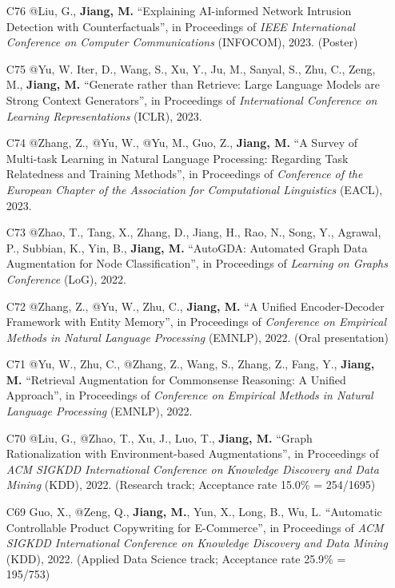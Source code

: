 \documentclass[10pt]{article}
\newenvironment{myindentpar}[1]%
{\begin{list}{}%
         {\setlength{\leftmargin}{#1}}%
         \item[]%
}
{\end{list}}
\newcounter{list}
\begin{document}
\begin{myindentpar}{0.00cm}
\begin{enumerate}[leftmargin=.5cm]
\item[C76] @Liu, G., \textbf{Jiang, M.} ``Explaining AI-informed Network Intrusion Detection with Counterfactuals'', in Proceedings of \textit{IEEE International Conference on Computer Communications} (INFOCOM), 2023. (Poster)
		
\item[C75] @Yu, W. Iter, D., Wang, S., Xu, Y., Ju, M., Sanyal, S., Zhu, C., Zeng, M., \textbf{Jiang, M.} ``Generate rather than Retrieve: Large Language Models are Strong Context Generators'', in Proceedings of \textit{International Conference on Learning Representations} (ICLR), 2023.

\item[C74] @Zhang, Z., @Yu, W., @Yu, M., Guo, Z., \textbf{Jiang, M.} ``A Survey of Multi-task Learning in Natural Language Processing: Regarding Task Relatedness and Training Methods'', in Proceedings of \textit{Conference of the European Chapter of the Association for Computational Linguistics} (EACL), 2023.

\item[C73] @Zhao, T., Tang, X., Zhang, D., Jiang, H., Rao, N., Song, Y., Agrawal, P., Subbian, K., Yin, B., \textbf{Jiang, M.} ``AutoGDA: Automated Graph Data Augmentation for Node Classification'', in Proceedings of \textit{Learning on Graphs Conference} (LoG), 2022.

\item[C72] @Zhang, Z., @Yu, W., Zhu, C., \textbf{Jiang, M.} ``A Unified Encoder-Decoder Framework with Entity Memory'', in Proceedings of \textit{Conference on Empirical Methods in Natural Language Processing} (EMNLP), 2022. (Oral presentation)

\item[C71] @Yu, W., Zhu, C., @Zhang, Z., Wang, S., Zhang, Z., Fang, Y., \textbf{Jiang, M.} ``Retrieval Augmentation for Commonsense Reasoning: A Unified Approach'', in Proceedings of \textit{Conference on Empirical Methods in Natural Language Processing} (EMNLP), 2022.

\item[C70] @Liu, G., @Zhao, T., Xu, J., Luo, T., \textbf{Jiang, M.} ``Graph Rationalization with Environment-based Augmentations'', in Proceedings of \textit{ACM SIGKDD International Conference on Knowledge Discovery and Data Mining} (KDD), 2022. (Research track; Acceptance rate 15.0\% = 254/1695)

\item[C69] Guo, X., @Zeng, Q., \textbf{Jiang, M.}, Yun, X., Long, B., Wu, L. ``Automatic Controllable Product Copywriting for E-Commerce'', in Proceedings of \textit{ACM SIGKDD International Conference on Knowledge Discovery and Data Mining} (KDD), 2022. (Applied Data Science track; Acceptance rate 25.9\% = 195/753)


\end{enumerate}
\end{myindentpar}
\end{document}
